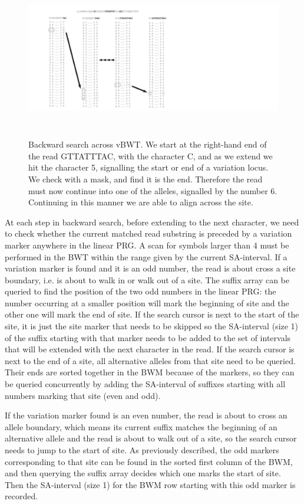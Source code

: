 \documentclass[runningheads,a4paper]{llncs}
\begin{document}
\begin{figure}
\centering
\includegraphics[height=7cm]{BWT.pdf}
\caption{Backward search across vBWT.  We start at the right-hand end of the read GTTATTTAC, with the character C, and as we extend we hit the character 5, signalling the start or end of a variation locus. We check with a mask, and find it is the end. Therefore the read must now continue into one of the alleles, signalled by the number 6. Continuing in this manner we are able to align across the site.}
\label{fig:example}
\end{figure}

At each step in backward search, before extending to the next character, we need to check whether the current matched read substring is preceded by a variation marker anywhere in the linear PRG. A scan for symbols larger than 4 must be performed in the BWT within the range given by the current SA-interval. If a variation marker is found and it is an odd number, the read is about cross a site boundary, i.e. is about to walk in or walk out of a site. The suffix array can be queried to find the position of the two odd numbers in the linear PRG: the number occurring at a smaller position will mark the beginning of site and the other one will mark the end of site. If the search cursor is next to the start of the site, it is just the site marker that needs to be skipped so the SA-interval (size 1) of the suffix starting with that marker needs to be added to the set of intervals that will be extended with the next character in the read. If the search cursor is next to the end of a site, all alternative alleles from that site need to be queried. Their ends are sorted together in the BWM because of the markers, so they can be queried concurrently by adding the SA-interval of suffixes starting with all numbers marking that site (even and odd). 

If the variation marker found is an even number, the read is about to cross an allele boundary, which means its current suffix matches the beginning of an alternative allele and the read is about to walk out of a site, so the search cursor needs to jump to the start of site. As previously described, the odd markers corresponding to that site can be found in the sorted first column of the BWM, and then querying the suffix array decides which one marks the start of site. Then the SA-interval (size 1) for the BWM row starting with this odd marker is recorded.
\end{document}
